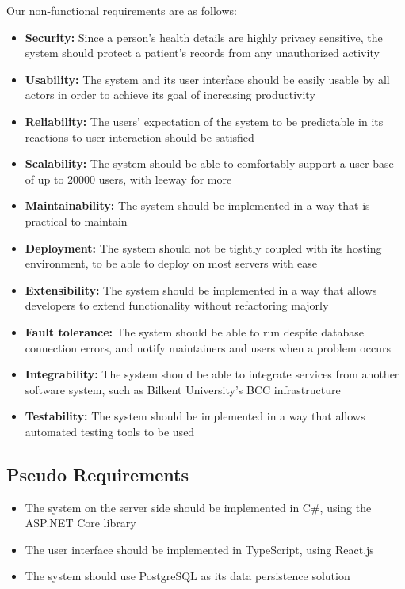 \documentclass[a4paper, 12pt, titlepage]{article}
\begin{document}
  Our non-functional requirements are as follows:

  \begin{itemize}
    \item \textbf{Security:} Since a person's health details are highly privacy sensitive, the system should protect a patient's records from any unauthorized activity
    \item \textbf{Usability:} The system and its user interface should be easily usable by all actors in order to achieve its goal of increasing productivity
    \item \textbf{Reliability:} The users' expectation of the system to be predictable in its reactions to user interaction should be satisfied
    \item \textbf{Scalability:} The system should be able to comfortably support a user base of up to 20000 users, with leeway for more
    \item \textbf{Maintainability:} The system should be implemented in a way that is practical to maintain
    \item \textbf{Deployment:} The system should not be tightly coupled with its hosting environment, to be able to deploy on most servers with ease
    \item \textbf{Extensibility:} The system should be implemented in a way that allows developers to extend functionality without refactoring majorly
    \item \textbf{Fault tolerance:} The system should be able to run despite database connection errors, and notify maintainers and users when a problem occurs
    \item \textbf{Integrability:} The system should be able to integrate services from another software system, such as Bilkent University's BCC infrastructure
    \item \textbf{Testability:} The system should be implemented in a way that allows automated testing tools to be used
  \end{itemize}

  \subsection{Pseudo Requirements}

  \begin{itemize}
    \item The system on the server side should be implemented in C\#, using the ASP.NET Core library
    \item The user interface should be implemented in TypeScript, using React.js
    \item The system should use PostgreSQL as its data persistence solution
  \end{itemize}
\end{document}
